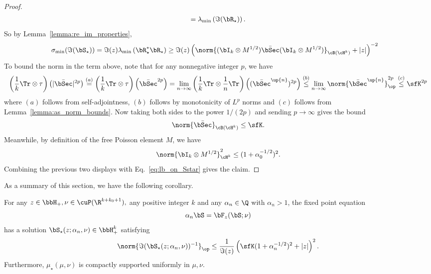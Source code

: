 \begin{proof}
\begin{align}
= 
\lambda_{\min}\left(\Im(\bR_\star)\right).
\nonumber
\end{align}
So by Lemma~\ref{lemma:re_im_properties}, 
\begin{align}
\sigma_{\min}(\Im(\bS_\star)) 
&= \Im(z)\lambda_{\min}\left(\bR_\star^* \bR_\star\right)
\ge  \Im(z) \left( \norm{(\bI_k \otimes M^{1/2}) \bar \bSec (\bI_k \otimes M^{1/2})}_{\cB(\cH^k)} + |z| \right)^{-2}
\label{eq:lb_on_Sstar}
\end{align}
To bound the norm in the term above, 
note that for any nonnegative integer $p$, we have
   \begin{equation}
   \nonumber
       \left(\frac1k \Tr \otimes \tau\right)\left(|\bar \bSec|^{2p}\right) 
\stackrel{(a)}{=}
       \left(\frac1k \Tr \otimes \tau\right)\left(\bar \bSec^{2p}\right) 
= 
\lim_{n\to\infty}\left(\frac1k \Tr \otimes \frac1n\Tr\right)\left((\bar \bSec^\up{n})^{2p}\right) \stackrel{(b)}{\le} \lim_{n\to\infty}\norm{\bar \bSec^\up{n}}_\op^{2p} \stackrel{(c)}{\le} \sfK^{2p}
   \end{equation}
where $(a)$ follows from self-adjointness, $(b)$ follows by monotonicity of $L^p$ norms and $(c)$ follows from Lemma~\ref{lemma:as_norm_bounds}. Now taking both sides to the power $1/(2p)$ and sending $p\to\infty$ gives the bound
\begin{equation}
\nonumber
    \norm{\bar \bSec}_{\cB(\cH^k)} \le \sfK.
\end{equation}
Meanwhile, by definition of the free Poisson element $M$, we have
\begin{equation}
\nonumber
\norm{\bI_k \otimes M^{1/2}}_{\cH^k}^2 \le (1+ \alpha_0^{-1/2})^2.
\end{equation}
Combining the previous two displays with Eq.~\eqref{eq:lb_on_Sstar} gives the claim.
\end{proof}
As a summary of this section, we have the following corollary.
\begin{corollary}
\label{cor:S_star_min_singular_value_bound}
For any $z\in\bbH_+,\nu\in\cuP(\R^{k+k_0+1}),$ any positive integer $k$ and any $\alpha_n \in\Q$ with $\alpha_n > 1$, the fixed point equation 
\begin{equation}
    \alpha_n \bS = \bF_z(\bS; \nu)
\end{equation}
has a solution $\bS_\star(z; \alpha_n, \nu) \in \bbH_+^k$ satisfying
\begin{equation}
    \norm{\Im(\bS_\star(z; \alpha_n, \nu))^{-1}}_\op \le \frac1{\Im(z)} \left(\sfK (1+ \alpha_n^{-1/2})^2 + |z|\right)^2.
\end{equation}
Furthermore, $\mu_\star(\mu,\nu)$ is compactly supported uniformly in $\mu,\nu$.

\end{corollary}
